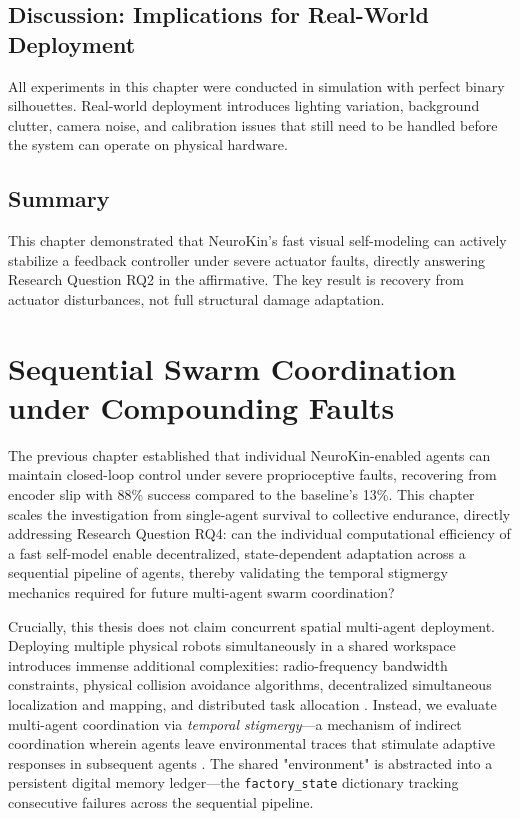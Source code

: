 \documentclass[12pt,a4paper,oneside]{report}
\begin{document}
\section{Discussion: Implications for Real-World Deployment}

All experiments in this chapter were conducted in simulation with perfect binary silhouettes. Real-world deployment introduces lighting variation, background clutter, camera noise, and calibration issues that still need to be handled before the system can operate on physical hardware.

\section{Summary}

This chapter demonstrated that NeuroKin's fast visual self-modeling can actively stabilize a feedback controller under severe actuator faults, directly answering Research Question RQ2 in the affirmative. The key result is recovery from actuator disturbances, not full structural damage adaptation.







\chapter{Sequential Swarm Coordination under Compounding Faults}
\label{chap:sequential_swarm_coordination}

The previous chapter established that individual NeuroKin-enabled agents can maintain closed-loop control under severe proprioceptive faults, recovering from encoder slip with 88\% success compared to the baseline's 13\%. This chapter scales the investigation from single-agent survival to collective endurance, directly addressing Research Question RQ4: can the individual computational efficiency of a fast self-model enable decentralized, state-dependent adaptation across a sequential pipeline of agents, thereby validating the temporal stigmergy mechanics required for future multi-agent swarm coordination?

Crucially, this thesis does not claim concurrent spatial multi-agent deployment. Deploying multiple physical robots simultaneously in a shared workspace introduces immense additional complexities: radio-frequency bandwidth constraints, physical collision avoidance algorithms, decentralized simultaneous localization and mapping, and distributed task allocation \cite{matsuki2024gaussian, keetha2024splattam}. Instead, we evaluate multi-agent coordination via \textit{temporal stigmergy}—a mechanism of indirect coordination wherein agents leave environmental traces that stimulate adaptive responses in subsequent agents \cite{bongard2006resilient}. The shared "environment" is abstracted into a persistent digital memory ledger—the \texttt{factory\_state} dictionary tracking consecutive failures across the sequential pipeline.
\end{document}

